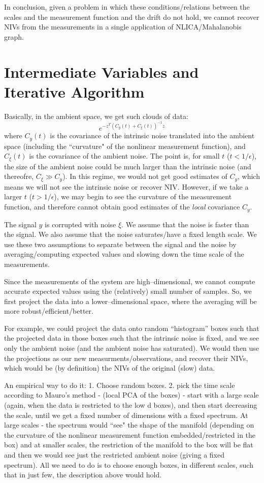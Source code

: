 \documentclass[12pt]{article}
\begin{document}
In conclusion, given a problem in which these conditions/relations between the scales and the measurement function and the drift do not hold, we cannot recover NIVs from the measurements in a single application of NLICA/Mahalanobis graph.

\section{Intermediate Variables and Iterative Algorithm}

Basically, in the ambient space, we get such clouds of data:
\[
	e^{-z^T(C_y(t) + C_\xi(t))^{-1} z}
\]
where $C_y(t)$ is the covariance of the intrinsic noise translated into the ambient space (including the ``curvature" of the nonlinear measurement function), and $C_\xi(t)$ is the covariance of the ambient noise.
%
The point is, for small $t$ ($t < 1/\epsilon$), the size of the ambient noise could be much larger than the intrinsic noise (and thereofre, $C_\xi \gg C_y$). 
%
In this regime, we would not get good estimates of $C_y$, which means we will not see the intrinsic noise or recover NIV.
%
However, if we take a larger $t$ ($t > 1/\epsilon$), we may begin to see the curvature of the measurement function, and therefore cannot obtain good estimates of the {\em local} covariance $C_y$. 

The signal $y$ is corrupted with noise $\xi$.
%
We assume that the noise is faster than the signal. 
%
We also assume that the noise saturates/have a fixed length scale.
%
We use these two assumptions to separate between the signal and the noise by averaging/computing expected values and slowing down the time scale of the measurements.

Since the measurements of the system are high--dimensional, we cannot compute accurate expected values using the (relatively) small number of samples.
%
So, we first project the data into a lower--dimensional space, where the averaging will be more robust/efficient/better.
%

For example, we could project the data onto random ``histogram'' boxes such that the projected data in those boxes such that the intrinsic noise is fixed, and we see only the ambient noise (and the ambient noise has saturated).
%
We would then use the projections as our new measurments/observations, and recover their NIVs, which would be (by definition) the NIVs of the original (slow) data. 

An empirical way to do it: 1. Choose random boxes. 2. pick the time scale according to Mauro's method - (local PCA of the boxes) - start with a large scale (again, when the data is restricted to the low d boxes), and then start decreasing the scale, until we get a fixed number of dimensions with a fixed spectrum. At large scales - the spectrum would ``see" the shape of the manifold (depending on the curvature of the nonlinear measurement function embedded/restricted in the box) and at smaller scales, the restriction of the manifold to the box will be flat and then we would see just the restricted ambient noise (giving a fixed spectrum). All we need to do is to choose enough boxes, in different scales, such that in just few, the description above would hold.
\end{document}
